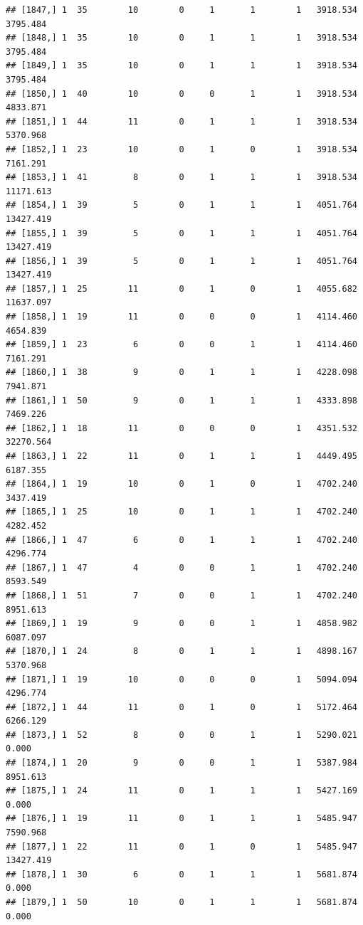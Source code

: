 \documentclass[
]{article}
\begin{document}
\begin{verbatim}
## [1847,] 1  35        10        0     1       1        1   3918.534   3795.484
## [1848,] 1  35        10        0     1       1        1   3918.534   3795.484
## [1849,] 1  35        10        0     1       1        1   3918.534   3795.484
## [1850,] 1  40        10        0     0       1        1   3918.534   4833.871
## [1851,] 1  44        11        0     1       1        1   3918.534   5370.968
## [1852,] 1  23        10        0     1       0        1   3918.534   7161.291
## [1853,] 1  41         8        0     1       1        1   3918.534  11171.613
## [1854,] 1  39         5        0     1       1        1   4051.764  13427.419
## [1855,] 1  39         5        0     1       1        1   4051.764  13427.419
## [1856,] 1  39         5        0     1       1        1   4051.764  13427.419
## [1857,] 1  25        11        0     1       0        1   4055.682  11637.097
## [1858,] 1  19        11        0     0       0        1   4114.460   4654.839
## [1859,] 1  23         6        0     0       1        1   4114.460   7161.291
## [1860,] 1  38         9        0     1       1        1   4228.098   7941.871
## [1861,] 1  50         9        0     1       1        1   4333.898   7469.226
## [1862,] 1  18        11        0     0       0        1   4351.532  32270.564
## [1863,] 1  22        11        0     1       1        1   4449.495   6187.355
## [1864,] 1  19        10        0     1       0        1   4702.240   3437.419
## [1865,] 1  25        10        0     1       1        1   4702.240   4282.452
## [1866,] 1  47         6        0     1       1        1   4702.240   4296.774
## [1867,] 1  47         4        0     0       1        1   4702.240   8593.549
## [1868,] 1  51         7        0     0       1        1   4702.240   8951.613
## [1869,] 1  19         9        0     0       1        1   4858.982   6087.097
## [1870,] 1  24         8        0     1       1        1   4898.167   5370.968
## [1871,] 1  19        10        0     0       0        1   5094.094   4296.774
## [1872,] 1  44        11        0     1       0        1   5172.464   6266.129
## [1873,] 1  52         8        0     0       1        1   5290.021      0.000
## [1874,] 1  20         9        0     0       1        1   5387.984   8951.613
## [1875,] 1  24        11        0     1       1        1   5427.169      0.000
## [1876,] 1  19        11        0     1       1        1   5485.947   7590.968
## [1877,] 1  22        11        0     1       0        1   5485.947  13427.419
## [1878,] 1  30         6        0     1       1        1   5681.874      0.000
## [1879,] 1  50        10        0     1       1        1   5681.874      0.000

\end{verbatim}
\end{document}
